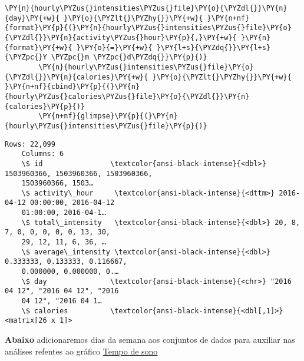 \begin{tcolorbox}[breakable, size=fbox, boxrule=1pt, pad at break*=1mm,colback=cellbackground, colframe=cellborder]
    \begin{Verbatim}[commandchars=\\\{\}]
        \PY{n}{hourly\PYZus{}intensities\PYZus{}file}\PY{o}{\PYZdl{}}\PY{n}{day}\PY{+w}{ }\PY{o}{\PYZlt{}\PYZhy{}}\PY{+w}{ }\PY{n+nf}{format}\PY{p}{(}\PY{n}{hourly\PYZus{}intensities\PYZus{}file}\PY{o}{\PYZdl{}}\PY{n}{activity\PYZus{}hour}\PY{p}{,}\PY{+w}{ }\PY{n}{format}\PY{+w}{ }\PY{o}{=}\PY{+w}{ }\PY{l+s}{\PYZdq{}}\PY{l+s}{\PYZpc{}Y \PYZpc{}m \PYZpc{}d\PYZdq{}}\PY{p}{)}
        \PY{n}{hourly\PYZus{}intensities\PYZus{}file}\PY{o}{\PYZdl{}}\PY{n}{calories}\PY{+w}{ }\PY{o}{\PYZlt{}\PYZhy{}}\PY{+w}{ }\PY{n+nf}{cbind}\PY{p}{(}\PY{n}{hourly\PYZus{}calories\PYZus{}file}\PY{o}{\PYZdl{}}\PY{n}{calories}\PY{p}{)}
        \PY{n+nf}{glimpse}\PY{p}{(}\PY{n}{hourly\PYZus{}intensities\PYZus{}file}\PY{p}{)}
    \end{Verbatim}
\end{tcolorbox}

\begin{Verbatim}[commandchars=\\\{\}]
    Rows: 22,099
    Columns: 6
    \$ id                \textcolor{ansi-black-intense}{<dbl>} 1503960366, 1503960366, 1503960366,
    1503960366, 1503…
    \$ activity\_hour     \textcolor{ansi-black-intense}{<dttm>} 2016-04-12 00:00:00, 2016-04-12
    01:00:00, 2016-04-1…
    \$ total\_intensity   \textcolor{ansi-black-intense}{<dbl>} 20, 8, 7, 0, 0, 0, 0, 0, 13, 30,
    29, 12, 11, 6, 36, …
    \$ average\_intensity \textcolor{ansi-black-intense}{<dbl>} 0.333333, 0.133333, 0.116667,
    0.000000, 0.000000, 0.…
    \$ day               \textcolor{ansi-black-intense}{<chr>} "2016 04 12", "2016 04 12", "2016
    04 12", "2016 04 1…
    \$ calories          \textcolor{ansi-black-intense}{<dbl[,1]>} <matrix[26 x 1]>
\end{Verbatim}

\textbf{Abaixo} adicionaremos dias da semana aos conjuntos de dados para
auxiliar nas análises refentes ao gráfico
\hyperref[subsection4-five]{Tempo de sono}


